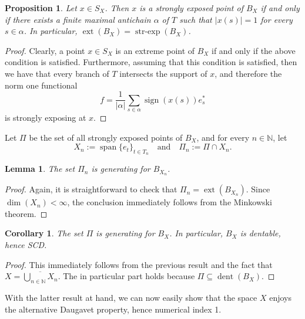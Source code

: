 \documentclass[11pt,a4paper,reqno]{amsart}
\numberwithin{equation}{section}
\newcommand{\abs}[1]{\left\lvert#1\right\rvert}
\newcommand{\N}{\mathbb{N}}
\DeclareMathOperator{\dent}{dent}
\DeclareMathOperator{\sign}{sign}
\DeclareMathOperator{\spn}{span}
\DeclareMathOperator{\ext}{ext}
\DeclareMathOperator{\strexp}{str-exp}
\newcommand{\1}{\mathbbm{1}}
\theoremstyle{plain}
\newtheorem{lemma}[theorem]{Lemma}
\newtheorem{proposition}[theorem]{Proposition}
\newtheorem{corollary}[theorem]{Corollary}
\theoremstyle{definition}
\begin{document}
\begin{proposition}\label{prop:stongly_exposed_points_characterization}
    Let $x\in S_X$. Then $x$ is a strongly exposed point of $B_X$ if and only if there exists a finite maximal antichain $\alpha$ of $T$ such that $\abs{x(s)}=1$ for every $s\in\alpha$. In particular, $\ext(B_X)=\strexp(B_X)$.
\end{proposition}

 \begin{proof}
 Clearly, a point $x\in S_X$ is an extreme point of $B_X$ if and only if the above condition is satisfied. Furthermore, assuming that this condition is satisfied, then we have that every branch of $T$ intersects the support of $x$, and therefore the norm one functional \begin{equation*}
        f = \frac{1}{\abs{\alpha}}\sum_{s\in \alpha}\sign(x(s))e^*_s
\end{equation*} is strongly exposing at $x$. 
\end{proof}

Let $\Pi$ be the set of all strongly exposed points of $B_X$, and for every $n\in\N$, let \begin{equation*}
    X_n:=\spn\{e_t\}_{t\in T_n} \quad\text{and}\quad  \Pi_n:=\Pi\cap X_n.
\end{equation*} 

\begin{lemma}
   The set $\Pi_n$ is generating for $B_{X_n}$.
\end{lemma}

\begin{proof}
    Again, it is straightforward to check that $\Pi_n=\ext(B_{X_n})$. Since $\dim(X_n)<\infty$, the conclusion immediately follows from the Minkowski theorem. 
\end{proof}

\begin{corollary}\label{cor:strongly_exposed_points_are_generating_for_B_X}
  The set $\Pi$ is generating for $B_X$. In particular, $B_X$ is dentable, hence SCD.
\end{corollary}

\begin{proof}
    This immediately follows from the previous result and the fact that $X=\overline{\bigcup_{n\in\N}X_n}$. The in particular part holds because $\Pi\subseteq \dent(B_X)$.
\end{proof}

With the latter result at hand, we can now easily show that the space $X$ enjoys the alternative Daugavet property, hence numerical index 1.
\end{document}
